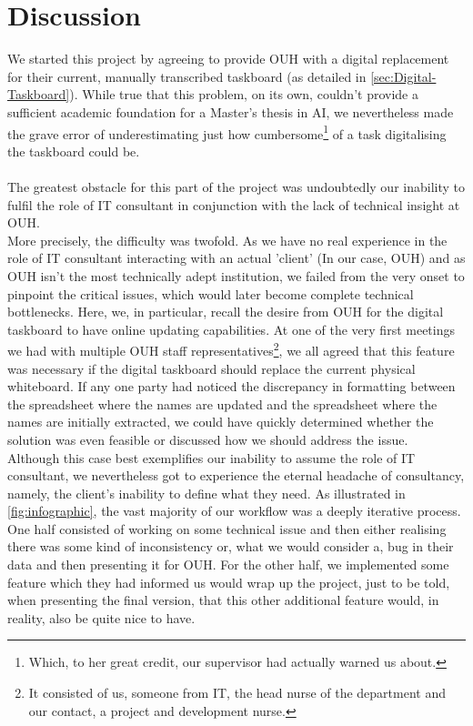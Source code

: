 \section{Discussion}
We started this project by agreeing to provide OUH with a digital replacement for their current, manually transcribed taskboard (as detailed in \autoref{sec:Digital-Taskboard}). While true that this problem, on its own, couldn't provide a sufficient academic foundation for a Master's thesis in AI, we nevertheless made the grave error of underestimating just how cumbersome\footnote{Which, to her great credit, our supervisor had actually warned us about.} of a task digitalising the taskboard could be.
\\
\\
The greatest obstacle for this part of the project was undoubtedly our inability to fulfil the role of IT consultant in conjunction with the lack of technical insight at OUH.
\\
More precisely, the difficulty was twofold. As we have no real experience in the role of IT consultant interacting with an actual 'client' (In our case, OUH) and as OUH isn't the most technically adept institution, we failed from the very onset to pinpoint the critical issues, which would later become complete technical bottlenecks. Here, we, in particular, recall the desire from OUH for the digital taskboard to have online updating capabilities. At one of the very first meetings we had with multiple OUH staff representatives\footnote{It consisted of us, someone from IT, the head nurse of the department and our contact, a project and development nurse.}, we all agreed that this feature was necessary if the digital taskboard should replace the current physical whiteboard. If any one party had noticed the discrepancy in formatting between the spreadsheet where the names are updated and the spreadsheet where the names are initially extracted, we could have quickly determined whether the solution was even feasible or discussed how we should address the issue.
\\
Although this case best exemplifies our inability to assume the role of IT consultant, we nevertheless got to experience the eternal headache of consultancy, namely, the client's inability to define what they need. As illustrated in \autoref{fig:infographic}, the vast majority of our workflow was a deeply iterative process. One half consisted of working on some technical issue and then either realising there was some kind of inconsistency or, what we would consider a, bug in their data and then  presenting it for OUH. For the other half, we implemented some feature which they had informed us would wrap up the project, just to be told, when presenting the final version, that this other additional feature would, in reality, also be quite nice to have.
